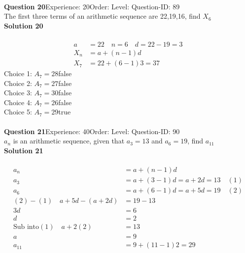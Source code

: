 \documentclass{article}
\begin{document}
\\[4pt]
\noindent\textbf{Question 20}\hspace{20pt}Experience: 20\hspace{20pt}Order: \hspace{20pt}Level: \hspace{20pt}Question-ID: 89\\[2pt]
The first three terms of an arithmetic sequence are 22,19,16, find $X_6$\\[4pt]
\noindent\textbf{Solution 20}\\[2pt]
\\[-35pt]\begin{align*}
a&=22 \quad n=6 \quad d=22-19=3\\[2pt]
X_n&=a+(n-1)d\\[2pt]
X_7&=22+(6-1)3=37
\end{align*}
Choice 1: \hspace{20pt}$A_7=28$\hspace{20pt}false\\
Choice 2: \hspace{20pt}$A_7=27$\hspace{20pt}false\\
Choice 3: \hspace{20pt}$A_7=30$\hspace{20pt}false\\
Choice 4: \hspace{20pt}$A_7=26$\hspace{20pt}false\\
Choice 5: \hspace{20pt}$A_7=29$\hspace{20pt}true\\
\\[4pt]
\noindent\textbf{Question 21}\hspace{20pt}Experience: 40\hspace{20pt}Order: \hspace{20pt}Level: \hspace{20pt}Question-ID: 90\\[2pt]
$a_n$ is an arithmetic sequence, given that $a_3=13$ and $a_6=19$, find $a_{11}$\\[4pt]
\noindent\textbf{Solution 21}\\[2pt]
\\[-35pt]\begin{align*}
a_n&=a+(n-1)d\\[2pt]
a_3&=a+(3-1)d=a+2d=13\quad (1)\\[2pt]
a_6&=a+(6-1)d=a+5d=19\quad (2)\\[2pt]
(2)-(1)\quad a+5d-(a+2d)&=19-13\\[2pt]
3d&=6\\[2pt]
d&=2\\[12pt]
\text{Sub into} (1) \quad a+2(2)&=13\\[2pt]
a&=9\\[12pt]
a_{11}&=9+(11-1)2=29
\end{align*}
\end{document}
